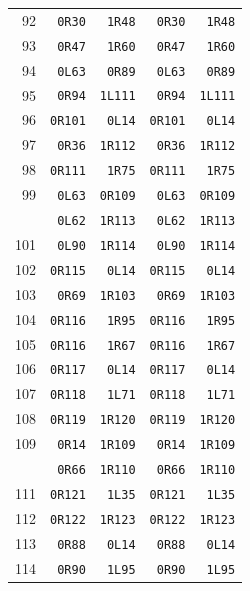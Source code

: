 \begin{longtable}{@{}r r r r r@{}}
92 & \texttt{0R30} & \texttt{1R48} & \texttt{0R30} & \texttt{1R48}\\
93 & \texttt{0R47} & \texttt{1R60} & \texttt{0R47} & \texttt{1R60}\\
94 & \texttt{0L63} & \texttt{0R89} & \texttt{0L63} & \texttt{0R89}\\
95 & \texttt{0R94} & \texttt{1L111} & \texttt{0R94} & \texttt{1L111}\\
96 & \texttt{0R101} & \texttt{0L14} & \texttt{0R101} & \texttt{0L14}\\
97 & \texttt{0R36} & \texttt{1R112} & \texttt{0R36} & \texttt{1R112}\\
98 & \texttt{0R111} & \texttt{1R75} & \texttt{0R111} & \texttt{1R75}\\
99 & \texttt{0L63} & \texttt{0R109} & \texttt{0L63} & \texttt{0R109}\\
\addlinespace[3pt]
100 & \texttt{0L62} & \texttt{1R113} & \texttt{0L62} & \texttt{1R113}\\
101 & \texttt{0L90} & \texttt{1R114} & \texttt{0L90} & \texttt{1R114}\\
102 & \texttt{0R115} & \texttt{0L14} & \texttt{0R115} & \texttt{0L14}\\
103 & \texttt{0R69} & \texttt{1R103} & \texttt{0R69} & \texttt{1R103}\\
104 & \texttt{0R116} & \texttt{1R95} & \texttt{0R116} & \texttt{1R95}\\
105 & \texttt{0R116} & \texttt{1R67} & \texttt{0R116} & \texttt{1R67}\\
106 & \texttt{0R117} & \texttt{0L14} & \texttt{0R117} & \texttt{0L14}\\
107 & \texttt{0R118} & \texttt{1L71} & \texttt{0R118} & \texttt{1L71}\\
108 & \texttt{0R119} & \texttt{1R120} & \texttt{0R119} & \texttt{1R120}\\
109 & \texttt{0R14} & \texttt{1R109} & \texttt{0R14} & \texttt{1R109}\\
\addlinespace[3pt]
110 & \texttt{0R66} & \texttt{1R110} & \texttt{0R66} & \texttt{1R110}\\
111 & \texttt{0R121} & \texttt{1L35} & \texttt{0R121} & \texttt{1L35}\\
112 & \texttt{0R122} & \texttt{1R123} & \texttt{0R122} & \texttt{1R123}\\
113 & \texttt{0R88} & \texttt{0L14} & \texttt{0R88} & \texttt{0L14}\\
114 & \texttt{0R90} & \texttt{1L95} & \texttt{0R90} & \texttt{1L95}\\

\end{longtable}
